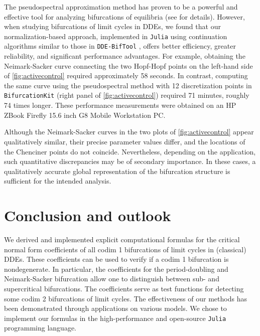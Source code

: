 \documentclass[english]{myarticle}
\begin{document}
\begin{sloppypar}
The pseudospectral approximation method has proven to be a powerful and effective tool for analyzing bifurcations of equilibria (see \cite{Breda2016, Ando2022, Wolff2021} for details). However, when studying bifurcations of limit cycles in DDEs, we found that our normalization-based approach, implemented in \verb|Julia| using continuation algorithms similar to those in \verb|DDE-BifTool| \cite{Engelborghs2002,Sieber2014}, offers better efficiency, greater reliability, and significant performance advantages. For example, obtaining the Neimark-Sacker curve connecting the two Hopf-Hopf points on the left-hand side of \cref{fig:activecontrol} required approximately 58 seconds. In contrast, computing the same curve using the pseudospectral method with 12 discretization points in \verb|BifurcationKit| \cite{Veltz2020} (right panel of \cref{fig:activecontrol}) required 71 minutes, roughly 74 times longer. These performance measurements were obtained on an HP ZBook Firefly 15.6 inch G8 Mobile Workstation PC.

Although the Neimark-Sacker curves in the two plots of \cref{fig:activecontrol} appear qualitatively similar, their precise parameter values differ, and the locations of the Chenciner points do not coincide. Nevertheless, depending on the application, such quantitative discrepancies may be of secondary importance. In these cases, a qualitatively accurate global representation of the bifurcation structure is sufficient for the intended analysis.

\section{Conclusion and outlook}
We derived and implemented explicit computational formulas for the critical normal form coefficients of all codim 1 bifurcations of limit cycles in (classical) DDEs. These coefficients can be used to verify if a codim 1 bifurcation is nondegenerate. In particular, the coefficients for the period-doubling and Neimark-Sacker bifurcation allow one to distinguish between sub- and supercritical bifurcations. The coefficients serve as test functions for detecting some codim 2 bifurcations of limit cycles. The effectiveness of our methods has been demonstrated through applications on various models. We chose to implement our formulas in the high-performance and open-source \verb|Julia| programming language.


\end{sloppypar}
\end{document}
